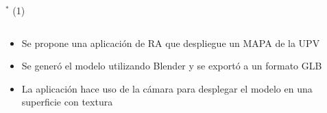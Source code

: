 						 
\begin{frame}{$^*$  (1)}
\begin{columns}
\begin{column}{0.99\textwidth}
	\begin{itemize}
		\item Se propone una aplicación de RA que despliegue un MAPA de la UPV
		\item Se generó el modelo utilizando Blender y se exportó a un formato GLB
		\item La aplicación hace uso de la cámara para desplegar el modelo en una superficie con textura
	\end{itemize}
\end{column}
\begin{column}{0.01\textwidth}  
\begin{center}
     \begin{tabular}{c}
      \end{tabular}
\end{center}
\end{column} 
\end{columns} 
\end{frame}


